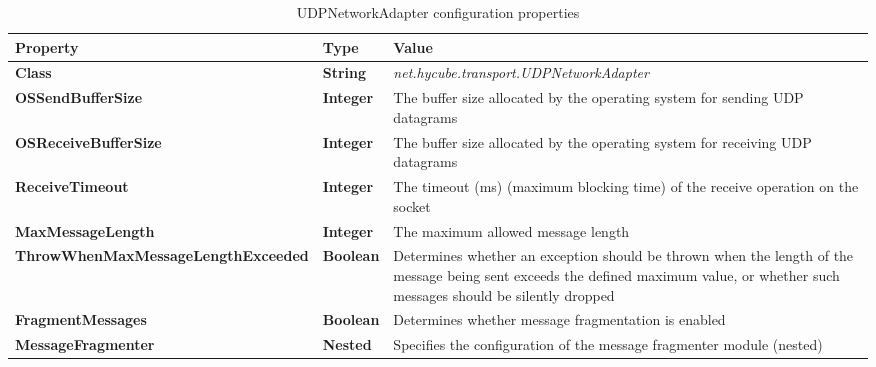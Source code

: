 \begin{table}
\scriptsize
\begin{center}
\begin{tabular}{p{5.0cm} p{1.0cm} p{8.5cm}}
	\hline
	\textbf{Property}							& \textbf{Type}					& \textbf{Value}					\\[1mm]
    \hline
	\textbf{Class}								& \textbf{String}				& \textit{net.hycube.transport.UDPNetworkAdapter}									\\[1.5mm]	
	\textbf{OSSendBufferSize}					& \textbf{Integer}				& The buffer size allocated by the operating system for sending UDP datagrams		\\[1.5mm]	
	\textbf{OSReceiveBufferSize}				& \textbf{Integer}				& The buffer size allocated by the operating system for receiving UDP datagrams		\\[1.5mm]	
	\textbf{ReceiveTimeout}						& \textbf{Integer}				& The timeout (ms) (maximum blocking time) of the receive operation on the socket		\\[1.5mm]	
	\textbf{MaxMessageLength}					& \textbf{Integer}				& The maximum allowed message length												\\[1.5mm]	
	\textbf{ThrowWhenMaxMessageLengthExceeded}	& \textbf{Boolean}				& Determines whether an exception should be thrown when the length of the message being sent exceeds the defined maximum value, or whether such messages should be silently dropped		\\[1.5mm]	
	\textbf{FragmentMessages}					& \textbf{Boolean}				& Determines whether message fragmentation is enabled		\\[1.5mm]	
	\textbf{MessageFragmenter}					& \textbf{Nested}				& Specifies the configuration of the message fragmenter module (nested)				\\[1.5mm]	
    \hline
\end{tabular}
\end{center}
\caption{UDPNetworkAdapter configuration properties}
\label{tab:libUDPNetworkAdapter}
\end{table}


